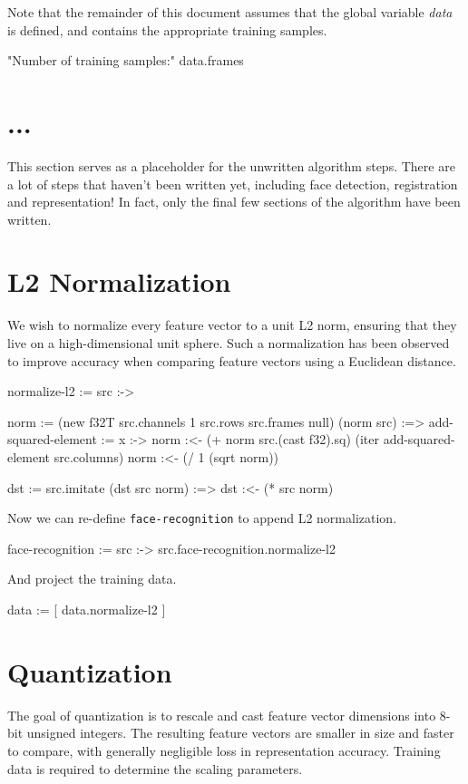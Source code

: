 \documentclass{article}
\begin{document}
Note that the remainder of this document assumes that the global variable \emph{data} is defined, and contains the appropriate training samples.

\begin{likely}
"Number of training samples:"
data.frames
\end{likely}

\section{...}
This section serves as a placeholder for the unwritten algorithm steps.
There are a lot of steps that haven't been written yet, including face detection, registration and representation!
In fact, only the final few sections of the algorithm have been written.

\section{L2 Normalization}
We wish to normalize every feature vector to a unit L2 norm, ensuring that they live on a high-dimensional unit sphere.
Such a normalization has been observed to improve accuracy when comparing feature vectors using a Euclidean distance.

\begin{likely}
normalize-l2 :=
  src :->
  {
    norm := (new f32T src.channels 1 src.rows src.frames null)
    (norm src) :=>
    {
      add-squared-element :=
        x :->
          norm :<- (+ norm src.(cast f32).sq)
      (iter add-squared-element src.columns)
      norm :<- (/ 1 (sqrt norm))
    }

    dst := src.imitate
    (dst src norm) :=>
      dst :<- (* src norm)
  }
\end{likely}

Now we can re-define \texttt{face-recognition} to append L2 normalization.

\begin{likely}
face-recognition :=
  src :->
    src.face-recognition.normalize-l2
\end{likely}

And project the training data.

\begin{likely}
data := [ data.normalize-l2 ]
\end{likely}

\section{Quantization}
The goal of quantization is to rescale and cast feature vector dimensions into 8-bit unsigned integers.
The resulting feature vectors are smaller in size and faster to compare, with generally negligible loss in representation accuracy.
Training data is required to determine the scaling parameters.
\end{document}
